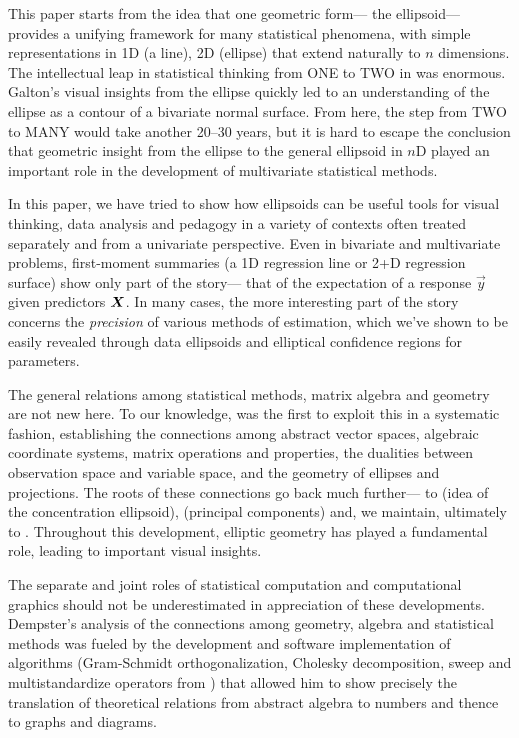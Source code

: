 This paper starts from the idea that one geometric form--- the ellipsoid---
provides a unifying framework for many statistical phenomena, with simple representations in
1D (a line), 2D (ellipse) that extend naturally to $n$ dimensions.  The intellectual leap 
in statistical thinking from ONE to TWO in \citet{Galton:1886} was enormous.
Galton's visual insights from the ellipse quickly led to an understanding of the
ellipse as a contour of a bivariate normal surface.  From here, the step from TWO to MANY
would take another 20--30 years, but it is hard to escape the conclusion that 
geometric insight from the ellipse to the general ellipsoid in $n$D
played an important role in the development of multivariate statistical methods.

In this paper, we have tried to show how ellipsoids can be useful tools for
visual thinking, data analysis and pedagogy in a variety of contexts often
treated separately and from a univariate perspective.  Even in bivariate 
and multivariate problems, first-moment summaries (a 1D regression line
or 2+D regression surface) show only part of the story--- that of the
expectation of a response $\vec{y}$ given predictors $\bm{X}$.
In many cases, the more interesting part of the story concerns the 
\emph{precision} of various methods of estimation, which we've shown
to be easily revealed through data ellipsoids and
elliptical confidence regions for parameters.

The general relations among statistical methods, matrix algebra and geometry are
not new here.  To our knowledge, \citet{Dempster:69} was the first to exploit this
in a systematic fashion, establishing the connections among abstract vector spaces,
algebraic coordinate systems, matrix operations and properties, the dualities
between observation space and variable space,
 and the geometry
of ellipses and projections.%
The roots of these connections go back much further---
to 
\citet{Cramer:1946} (idea of the concentration ellipsoid),
\citet{Hotelling:1933} (principal components)
and, we maintain, ultimately to \citet{Galton:1886}.
Throughout this development, elliptic geometry has played 
a fundamental role, leading to important visual insights.

The separate and joint roles of statistical computation and computational graphics should not be underestimated
in appreciation of these developments.  Dempster's analysis of the connections among geometry, algebra and
statistical methods was fueled by the development and software implementation of algorithms 
(Gram-Schmidt orthogonalization, Cholesky decomposition, sweep and multistandardize operators from
\citet{Beaton:64})
that allowed him to show precisely the translation of theoretical relations
from abstract algebra to numbers and thence to graphs and diagrams.  

